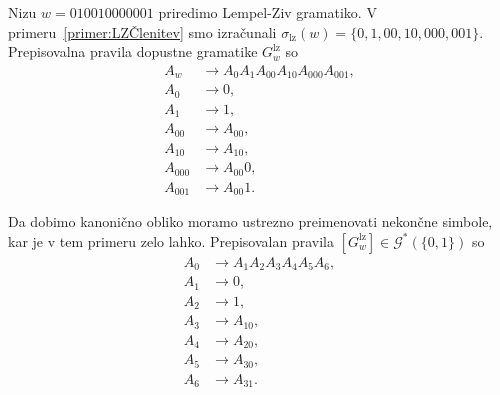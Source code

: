 \documentclass[fin1, tisk]{fmfdelo}
\newcommand{\G}{\mathcal{G}}
\theoremstyle{definition}
\begin{document}
\begin{primer}
    Nizu $w = 010010000001$ priredimo Lempel-Ziv gramatiko.
    V primeru~\ref{primer:LZČlenitev} smo izračunali 
    $\sigma_{\text{lz}}(w) = \{ 0, 1, 00, 10, 000, 001 \}$. Prepisovalna pravila dopustne 
    gramatike $G^\text{lz}_w$ so
    \begin{align*}
        A_w &\rightarrow A_0A_1A_{00}A_{10}A_{000}A_{001}, \\
        A_0 &\rightarrow 0, \\
        A_1 &\rightarrow 1, \\
        A_{00} &\rightarrow A_00, \\
        A_{10} &\rightarrow A_10, \\
        A_{000} &\rightarrow A_{00}0, \\
        A_{001} &\rightarrow A_{00}1.
    \end{align*}

    Da dobimo kanonično obliko moramo ustrezno preimenovati nekončne simbole, kar
    je v tem primeru zelo lahko. Prepisovalan pravila $[G^\text{lz}_w] \in \G^*(\{ 0, 1 \})$ so
    \begin{align*}
        A_0 &\rightarrow A_1A_2A_3A_4A_5A_6, \\
        A_1 &\rightarrow 0, \\
        A_2 &\rightarrow 1, \\
        A_3 &\rightarrow A_10, \\
        A_4 &\rightarrow A_20, \\
        A_5 &\rightarrow A_30, \\
        A_6 &\rightarrow A_31.
    \end{align*}
\end{primer}
\end{document}
